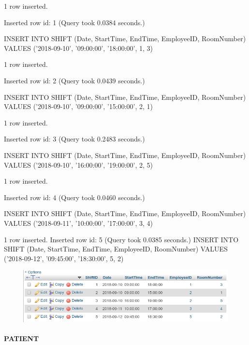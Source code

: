 \documentclass[11pt]{article}
\makeatletter
\def\maxwidth{\ifdim\Gin@nat@width>\linewidth\linewidth
    \else\Gin@nat@width\fi}
\let\Oldincludegraphics\includegraphics
\renewcommand{\includegraphics}[1]{\Oldincludegraphics[width=.8\maxwidth]{#1}}
\makeatother
\begin{document}
    1 row inserted.

Inserted row id: 1 (Query took 0.0384 seconds.)

INSERT INTO SHIFT (Date, StartTime, EndTime, EmployeeID, RoomNumber)
VALUES ('2018-09-10', '09:00:00', '18:00:00', 1, 3)

1 row inserted.

Inserted row id: 2 (Query took 0.0439 seconds.)

INSERT INTO SHIFT (Date, StartTime, EndTime, EmployeeID, RoomNumber)
VALUES ('2018-09-10', '09:00:00', '15:00:00', 2, 1)

1 row inserted.

Inserted row id: 3 (Query took 0.2483 seconds.)

INSERT INTO SHIFT (Date, StartTime, EndTime, EmployeeID, RoomNumber)
VALUES ('2018-09-10', '16:00:00', '19:00:00', 2, 5)

1 row inserted.

Inserted row id: 4 (Query took 0.0460 seconds.)

INSERT INTO SHIFT (Date, StartTime, EndTime, EmployeeID, RoomNumber)
VALUES ('2018-09-11', '10:00:00', '17:00:00', 3, 4)

1 row inserted. Inserted row id: 5 (Query took 0.0385 seconds.) INSERT
INTO SHIFT (Date, StartTime, EndTime, EmployeeID, RoomNumber) VALUES
('2018-09-12', '09:45:00', '18:30:00', 5, 2)

    \begin{figure}[H]
\centering
\includegraphics{shift_2.png}
\caption{}
\end{figure}

    \paragraph{PATIENT}\label{patient}
\end{document}
